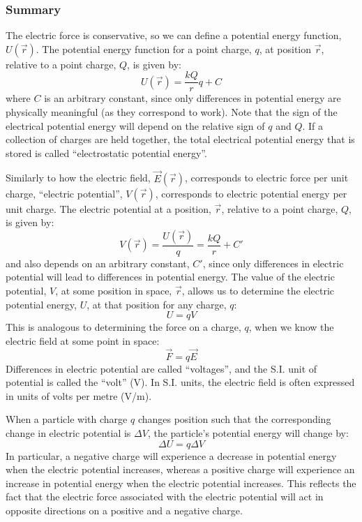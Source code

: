 \subsubsection{Summary}

The electric force is conservative, so we can define a potential energy function, $U(\vec r)$. The potential energy function for a point charge, $q$, at position $\vec r$, relative to a point charge, $Q$, is given by:
\begin{equation}
U(\vec r) = \frac{kQ}{r}q + C
\end{equation}
where $C$ is an arbitrary constant, since only differences in potential energy are physically meaningful (as they correspond to work). Note that the sign of the electrical potential energy will depend on the relative sign of $q$ and $Q$. If a collection of charges are held together, the total electrical potential energy that is stored is called ``electrostatic potential energy''.

Similarly to how the electric field, $\vec E(\vec r)$, corresponds to electric force per unit charge, ``electric potential'', $V(\vec r)$, corresponds to electric potential energy per unit charge. The electric potential at a position, $\vec r$, relative to a point charge, $Q$, is given by:
\begin{equation}
V(\vec r) =\frac{U(\vec r)}{q}= \frac{kQ}{r} + C'
\end{equation}
and also depends on an arbitrary constant, $C'$, since only differences in electric potential will lead to differences in potential energy. The value of the electric potential, $V$, at some position in space, $\vec r$, allows us to determine the electric potential energy, $U$, at that position for any charge, $q$:
\begin{equation}
U = qV
\end{equation}
This is analogous to determining the force on a charge, $q$, when we know the electric field at some point in space:
\begin{equation}
\vec F = q \vec E
\end{equation}
Differences in electric potential are called ``voltages'', and the S.I. unit of potential is called the ``volt'' (V). In S.I. units, the electric field is often expressed in units of volts per metre (V/m).

When a particle with charge $q$ changes position such that the corresponding change in electric potential is $\Delta V$, the particle's potential energy will change by:
\begin{equation}
\Delta U = q\Delta V
\end{equation}
In particular, a negative charge will experience a decrease in potential energy when the electric potential increases, whereas a positive charge will experience an increase in potential energy when the electric potential increases. This reflects the fact that the electric force associated with the electric potential will act in opposite directions on a positive and a negative charge.

